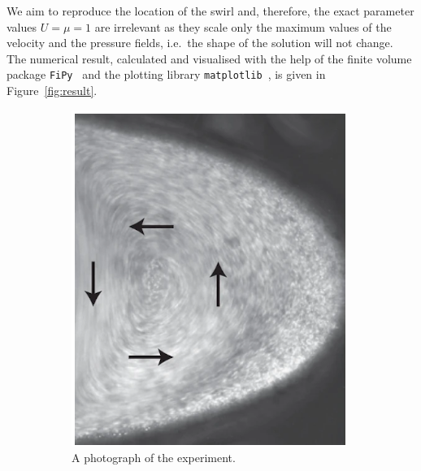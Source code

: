 \documentclass[12pt]{rmstyle}
\begin{document}
We aim to reproduce the location of the swirl and, therefore, the exact
parameter values $U=\mu=1$ are irrelevant as they scale only the maximum values
of the velocity and the pressure fields, i.e.~the shape of the solution will not
change.  The numerical result, calculated and visualised with the help of the
finite volume package \verb|FiPy|~\cite{FiPy2009} and the plotting library
\verb|matplotlib|~\cite{hunter2007matplotlib}, is given in
Figure~\ref{fig:result}.

\begin{figure}[htbp]
  \centering
  \begin{subfigure}[b]{0.3\textwidth}
    \centering
    \includegraphics[width=\textwidth]{./esimerkki_1.png}
    \caption{A photograph of the experiment. \cite{mayzel2019stokes}}
    \label{fig:photo}
  \end{subfigure}
  \hspace{2cm}
  \begin{subfigure}[b]{0.3\textwidth}
    \centering

\end{subfigure}
\end{figure}
\end{document}
